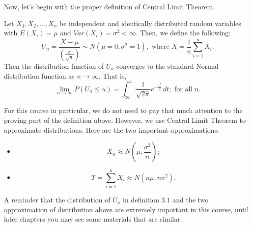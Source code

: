 \noindent
Now, let's begin with the proper definition of Central Limit Theorem.

\begin{definition}
Let $X_1, X_2, ..., X_n$ be independent and identically distributed random variables with $E(X_i) = \mu$ and $Var(X_i) = \sigma^2 < \infty$. Then, we define the following: \[ U_{n} = \frac{\bar{X} - \mu}{(\frac{\sigma}{\sqrt{n}})} \sim N(\mu = 0, \sigma^2 = 1), \text{ where $\bar{X} = \frac{1}{n} \sum_{i =1}^{n}X_i$.}\]
Then the distribution function of $U_{n}$ converges to the standard Normal distribution function as $n \longrightarrow \infty$. That is, \[ \lim_{n\to\infty}P(U_n \le u) = \int_{\infty}^{u} \frac{1}{\sqrt{2\pi}} e^{-\frac{t^2}{2}}\,dt; \text{ for all u.}\]
\end{definition}

\noindent
For this course in particular, we do not need to pay that much attention to the proving part of the definition above. However, we use Central Limit Theorem to approximate distributions. Here are the two important approximations:

\begin{itemize}
	\item \[ \bar{X_n} \approx N(\mu, \frac{\sigma^2}{n});\]
	\item \[ T = \sum_{i = 1}^{n}X_i \approx N(n\mu, n\sigma^2).\]
\end{itemize}

\noindent
A reminder that the distribution of $U_n$ in definition $3.1$ and the two approximation of distribution above are extremely important in this course, until later chapters you may see some materials that are similar.
